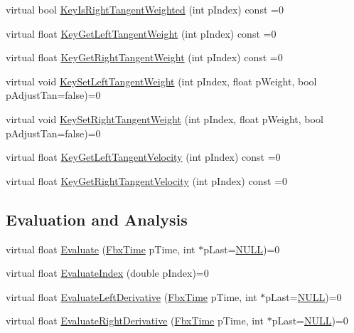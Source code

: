 \begin{DoxyCompactItemize}
\item 
virtual bool \hyperlink{class_fbx_anim_curve_af82ac790cdd052063e2c8dbd45ea54ca}{Key\+Is\+Right\+Tangent\+Weighted} (int p\+Index) const =0
\item 
virtual float \hyperlink{class_fbx_anim_curve_a9828bb0aa421a390a8bccdf161500e5a}{Key\+Get\+Left\+Tangent\+Weight} (int p\+Index) const =0
\item 
virtual float \hyperlink{class_fbx_anim_curve_a82f1cd10ca027ec52eb0facf47b9c9f4}{Key\+Get\+Right\+Tangent\+Weight} (int p\+Index) const =0
\item 
virtual void \hyperlink{class_fbx_anim_curve_a8733d2c8ebbb4e5d367dba81363fbf17}{Key\+Set\+Left\+Tangent\+Weight} (int p\+Index, float p\+Weight, bool p\+Adjust\+Tan=false)=0
\item 
virtual void \hyperlink{class_fbx_anim_curve_acf1994ed3720f3d3e98cfca8bf31ce25}{Key\+Set\+Right\+Tangent\+Weight} (int p\+Index, float p\+Weight, bool p\+Adjust\+Tan=false)=0
\item 
virtual float \hyperlink{class_fbx_anim_curve_ad51bde65942e896c8fb7619ef4a4d149}{Key\+Get\+Left\+Tangent\+Velocity} (int p\+Index) const =0
\item 
virtual float \hyperlink{class_fbx_anim_curve_a85a44ed49cc90f3c7dc53ca5da5107b3}{Key\+Get\+Right\+Tangent\+Velocity} (int p\+Index) const =0
\end{DoxyCompactItemize}
\subsection*{Evaluation and Analysis}
\begin{DoxyCompactItemize}
\item 
virtual float \hyperlink{class_fbx_anim_curve_a74a3ea7a22a69fe69141722adff7f01b}{Evaluate} (\hyperlink{class_fbx_time}{Fbx\+Time} p\+Time, int $\ast$p\+Last=\hyperlink{fbxarch_8h_a070d2ce7b6bb7e5c05602aa8c308d0c4}{N\+U\+LL})=0
\item 
virtual float \hyperlink{class_fbx_anim_curve_ad26cbb4cd0360aa8697a2601f8540a21}{Evaluate\+Index} (double p\+Index)=0
\item 
virtual float \hyperlink{class_fbx_anim_curve_a31c932aa6ca57749591a70f86498be5f}{Evaluate\+Left\+Derivative} (\hyperlink{class_fbx_time}{Fbx\+Time} p\+Time, int $\ast$p\+Last=\hyperlink{fbxarch_8h_a070d2ce7b6bb7e5c05602aa8c308d0c4}{N\+U\+LL})=0
\item 
virtual float \hyperlink{class_fbx_anim_curve_a02a8c8629fafa6a97b37a37fd2e77331}{Evaluate\+Right\+Derivative} (\hyperlink{class_fbx_time}{Fbx\+Time} p\+Time, int $\ast$p\+Last=\hyperlink{fbxarch_8h_a070d2ce7b6bb7e5c05602aa8c308d0c4}{N\+U\+LL})=0
\end{DoxyCompactItemize}
